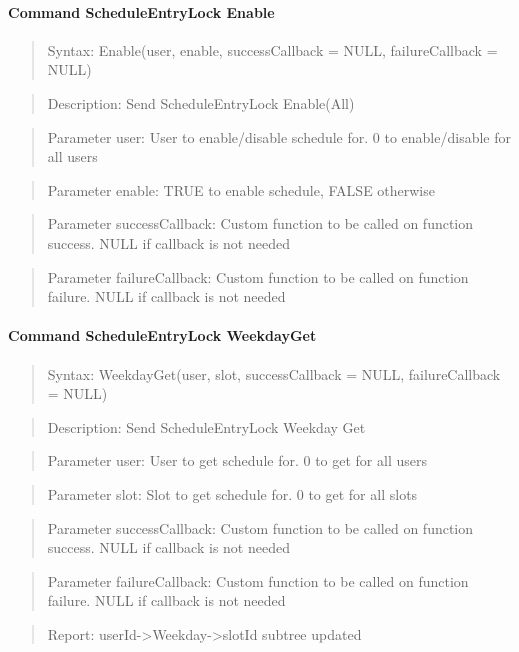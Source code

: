 \paragraph{Command ScheduleEntryLock Enable}
\begin{quote}Syntax: Enable(user, enable, successCallback = NULL, failureCallback = NULL)\end{quote}
\begin{quote}Description: Send ScheduleEntryLock Enable(All)\end{quote}
\begin{quote}Parameter user: User to enable/disable schedule for. 0 to enable/disable for all users\end{quote}
\begin{quote}Parameter enable: TRUE to enable schedule, FALSE otherwise\end{quote}
\begin{quote}Parameter successCallback: Custom function to be called on function success. NULL if callback is not needed\end{quote}
\begin{quote}Parameter failureCallback: Custom function to be called on function failure. NULL if callback is not needed\end{quote}


\paragraph{Command ScheduleEntryLock WeekdayGet}
\begin{quote}Syntax: WeekdayGet(user, slot, successCallback = NULL, failureCallback = NULL)\end{quote}
\begin{quote}Description: Send ScheduleEntryLock Weekday Get\end{quote}
\begin{quote}Parameter user: User to get schedule for. 0 to get for all users\end{quote}
\begin{quote}Parameter slot: Slot to get schedule for. 0 to get for all slots\end{quote}
\begin{quote}Parameter successCallback: Custom function to be called on function success. NULL if callback is not needed\end{quote}
\begin{quote}Parameter failureCallback: Custom function to be called on function failure. NULL if callback is not needed\end{quote}
\begin{quote}Report: userId->Weekday->slotId subtree updated\end{quote}

